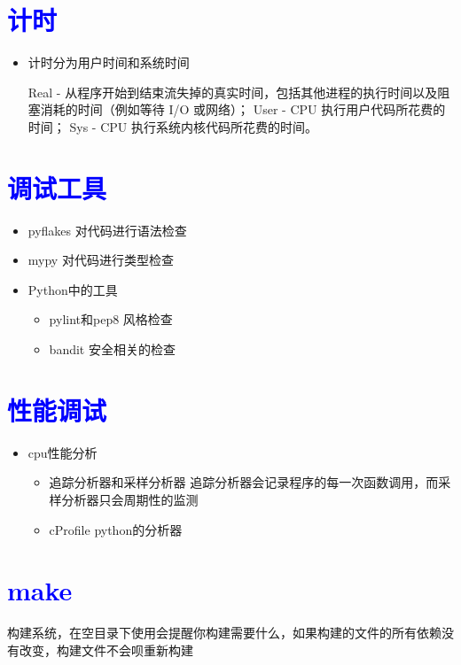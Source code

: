 \documentclass{article}
\begin{document}
\section{\textcolor{blue}{计时}}
\begin{itemize}
    \item 计时分为用户时间和系统时间
        \begin{itemize}
             Real - 从程序开始到结束流失掉的真实时间，包括其他进程的执行时间以及阻塞消耗的时间（例如等待 I/O 或网络）；
             User - CPU 执行用户代码所花费的时间；
             Sys - CPU 执行系统内核代码所花费的时间。
        \end{itemize}
\end{itemize}
\section{\textcolor{blue}{调试工具}}
    \begin{itemize}
      \item pyflakes    对代码进行语法检查    
      \item mypy    对代码进行类型检查
      \item Python中的工具
        \begin{itemize}
            \item pylint和pep8 风格检查
            \item bandit 安全相关的检查
        \end{itemize}
    \end{itemize}
\section{\textcolor{blue}{性能调试}}
    \begin{itemize}
        \item cpu性能分析
            \begin{itemize}
                \item   追踪分析器和采样分析器 追踪分析器会记录程序的每一次函数调用，而采样分析器只会周期性的监测
                \item cProfile python的分析器
            \end{itemize}
    \end{itemize}
\section{\textcolor{blue}{make}}
构建系统，在空目录下使用会提醒你构建需要什么，如果构建的文件的所有依赖没有改变，构建文件不会呗重新构建
\end{document}
